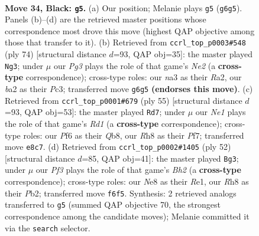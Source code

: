 \documentclass[11pt]{article}
\begin{document}
\clearpage

\begin{figure}[p]\centering
\begin{subfigure}{0.46\textwidth}\centering
\resizebox{\linewidth}{!}{%
\newchessgame
\chessboard[
  setfen={3qn2r/3b2k1/p4pp1/n1Q1p2p/P2PP3/N1P5/B4PPP/R3K1N1 b - - 0 34},
  showmover=false,
  pgfstyle=straightmove, color=movearrow, markmove={g6-g5}
]}
\caption{}
\end{subfigure}\hfill
\begin{subfigure}{0.46\textwidth}\centering
\resizebox{\linewidth}{!}{%
\newchessgame
\chessboard[
  setfen={1r4k1/5p2/1q1p1npb/p2Pp3/Q3P2B/2P4P/R3NPPK/8 w - - 1 38},
  showmover=false,
  pgfstyle=straightmove, color=movearrow, markmove={e2-g3}
]}
\caption{}
\end{subfigure}
\\[4pt]
\begin{subfigure}{0.46\textwidth}\centering
\resizebox{\linewidth}{!}{%
\newchessgame
\chessboard[
  setfen={1q1r4/p3bppk/Qp2p1p1/3n4/6P1/PP2PB1P/2RB1P2/6K1 b - - 0 28},
  showmover=false,
  pgfstyle=straightmove, color=movearrow, markmove={d8-d7}
]}
\caption{}
\end{subfigure}\hfill
\begin{subfigure}{0.46\textwidth}\centering
\resizebox{\linewidth}{!}{%
\newchessgame
\chessboard[
  setfen={6k1/1q2ppbn/1p1r4/p3Np1p/P1P2P2/7P/1P2Q1PB/4R1K1 w - - 0 27},
  showmover=false,
  pgfstyle=straightmove, color=movearrow, markmove={h2-g3}
]}
\caption{}
\end{subfigure}
\caption{\textbf{Move 34, Black: \texttt{g5}.} (a) Our position; Melanie plays \texttt{g5} (\texttt{g6g5}). Panels (b)--(d) are the retrieved master positions whose correspondence most drove this move (highest QAP objective among those that transfer to it). (b) Retrieved from \texttt{ccrl\_top\_p0003\#548} (ply 74) [structural distance $d$=93, QAP obj=35]: the master played \texttt{Ng3}; under $\mu$ our \emph{Pg3} plays the role of that game's \emph{Ne2} (a \textbf{cross-type} correspondence); cross-type roles: our \emph{n}a3 as their \emph{R}a2, our \emph{b}a2 as their \emph{P}c3; transferred move \texttt{g6g5} \textbf{(endorses this move)}. (c) Retrieved from \texttt{ccrl\_top\_p0001\#679} (ply 55) [structural distance $d$=93, QAP obj=53]: the master played \texttt{Rd7}; under $\mu$ our \emph{Ne1} plays the role of that game's \emph{Rd1} (a \textbf{cross-type} correspondence); cross-type roles: our \emph{P}f6 as their \emph{Q}b8, our \emph{R}h8 as their \emph{P}f7; transferred move \texttt{e8c7}. (d) Retrieved from \texttt{ccrl\_top\_p0002\#1405} (ply 52) [structural distance $d$=85, QAP obj=41]: the master played \texttt{Bg3}; under $\mu$ our \emph{Pf3} plays the role of that game's \emph{Bh2} (a \textbf{cross-type} correspondence); cross-type roles: our \emph{N}e8 as their \emph{R}e1, our \emph{R}h8 as their \emph{P}b2; transferred move \texttt{f6f5}. Synthesis: 2 retrieved analogs transferred to \texttt{g5} (summed QAP objective 70, the strongest correspondence among the candidate moves); Melanie committed it via the \texttt{search} selector.}
\label{fig:thought-m67}
\end{figure}
\end{document}
